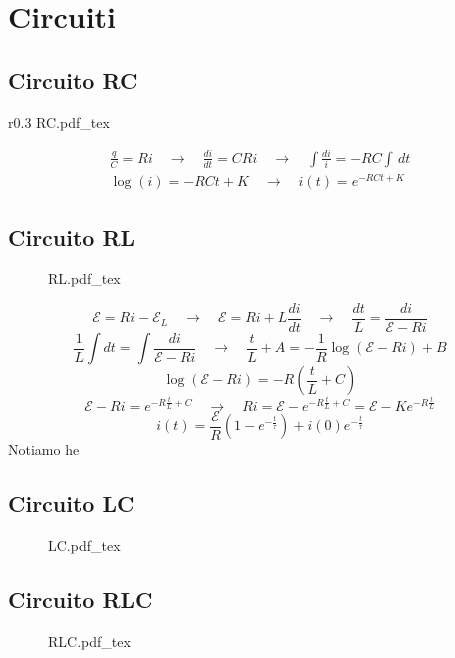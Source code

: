\documentclass[x11names]{report}
\newcommand{\incfig}[1]{%
	{#1.pdf_tex}
}
\begin{document}
\section{Circuiti}
\subsection{Circuito RC}
\begin{wrapfigure}{r}{0.3\textwidth}
	\incfig{RC}
\end{wrapfigure}
\begin{gather*}
	\frac{q}{C}=Ri \quad \to \quad \frac{di}{dt} = CRi \quad \to \quad \int\frac{di}{i} = -RC \int \, dt \\
	\log(i) =- RC t + K \quad \to \quad i(t) = e^{-RCt + K}
\end{gather*}




\subsection{Circuito RL}
\begin{figure}[H]
	\centering
	\incfig{RL}
\end{figure}
\[
\mathcal{E} = Ri - \mathcal{E}_L \quad \to \quad \mathcal{E} = Ri + L\frac{di}{dt} \quad \to \quad \frac{dt}{L} = \frac{di}{\mathcal{E}-Ri}
\]
\[
\frac{1}{L}\int dt = \int \frac{di}{\mathcal{E}-Ri} \quad \to \quad \frac{t}{L} + A = -\frac{1}{R}\log\left(\mathcal{E} - Ri\right) + B
\]
\[
\log\left(\mathcal{E} - Ri\right) = -R\left(\frac{t}{L} + C\right)
\]
\[
\mathcal{E} - Ri = e^{-R\frac{t}{L} + C}  \quad \to \quad Ri = \mathcal{E} - e^{-R\frac{t}{L} + C} = \mathcal{E} - Ke^{-R\frac{t}{L}}
\]
\[
i(t) = \frac{\mathcal{E}}{R}\left(1 - e^{-\frac{t}{\tau}}\right) + i(0)e^{-\frac{t}{\tau}}
\]
Notiamo he

\subsection{Circuito LC}
\begin{figure}[H]
	\centering
	\incfig{LC}
\end{figure}

\subsection{Circuito RLC}
\begin{figure}[H]
	\centering
	\incfig{RLC}
\end{figure}
\end{document}
